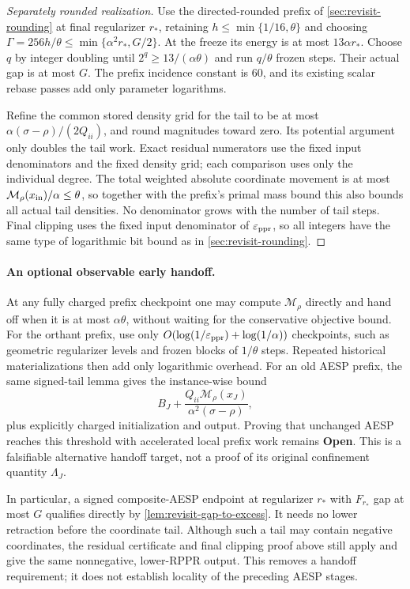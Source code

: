 \begin{proof}[Separately rounded realization]
Use the directed-rounded prefix of \cref{sec:revisit-rounding} at final
regularizer $r_*$, retaining $h\leq\min\{1/16,\theta\}$ and choosing
$\Gamma=256h/\theta\leq\min\{\alpha^2r_*,G/2\}$.
At the freeze its energy is at most $13\alpha r_*$. Choose $q$ by
integer doubling until $2^q\geq13/(\alpha\theta)$ and run $q/\theta$
frozen steps. Their actual gap is at most $G$. The prefix incidence
constant is $60$, and its existing scalar rebase passes add only parameter
logarithms.

Refine the common stored density grid for the tail to be at most
$\alpha(\sigma-\rho)/(2Q_{ii})$, and round magnitudes toward zero.
Its potential argument only doubles the tail work. Exact residual
numerators use the fixed input denominators and the fixed density grid;
each comparison uses only the individual degree. The total weighted
absolute coordinate movement is at most
$\mathcal M_\rho(x_{\rm in})/\alpha\leq\theta$, so together with the
prefix's primal mass bound this also bounds all actual tail densities.
No denominator grows with the number of tail steps. Final clipping uses
the fixed input denominator of $\varepsilon_{\mathrm{ppr}}$, so all integers have the same
type of logarithmic bit bound as in \cref{sec:revisit-rounding}.
\end{proof}

\paragraph{An optional observable early handoff.}
At any fully charged prefix checkpoint one may compute
$\mathcal M_\rho$ directly and hand off when it is at most
$\alpha\theta$, without waiting for the conservative objective bound.
For the orthant prefix, use only $O(\log(1/\varepsilon_{\mathrm{ppr}})+\log(1/\alpha))$
checkpoints, such as geometric regularizer levels and frozen blocks of
$1/\theta$ steps. Repeated historical materializations then add only
logarithmic overhead. For an old AESP prefix, the same signed-tail lemma
gives the instance-wise bound
\[
 B_J+\frac{Q_{ii}\mathcal M_\rho(x_J)}
                 {\alpha^2(\sigma-\rho)},
\]
plus explicitly charged initialization and output. Proving that unchanged
AESP reaches this threshold with accelerated local prefix work remains
\textbf{Open}. This is a falsifiable alternative handoff target, not a
proof of its original confinement quantity $\Lambda_J$.

In particular, a signed composite-AESP endpoint at regularizer $r_*$ with
$F_{r_*}$ gap at most $G$ qualifies directly by
\cref{lem:revisit-gap-to-excess}. It needs no lower retraction before the
coordinate tail. Although such a tail may contain negative coordinates,
the residual certificate and final clipping proof above still apply and
give the same nonnegative, lower-RPPR output. This removes a handoff
requirement; it does not establish locality of the preceding AESP stages.
